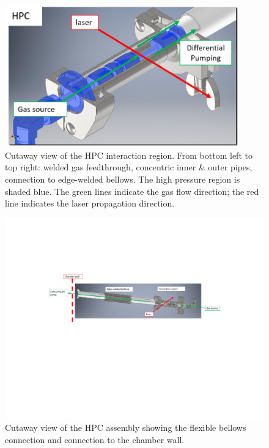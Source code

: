 \begin{figure}
	\centering
	\includegraphics[width=0.9\textwidth]{figures/chap3/HPC_cutaway2.png}
	\caption{Cutaway view of the HPC interaction region. From bottom left to top right: welded gas feedthrough, concentric inner \& outer pipes, connection to edge-welded bellows. The high pressure region is shaded blue. The green lines indicate the gas flow direction; the red line indicates the laser propagation direction.}
	\label{fig:HPC_cutaway2}
\end{figure}

\begin{figure}
	\centering
	\includegraphics[width=1.0\textwidth]{figures/chap3/HPC_cutaway_bellows.pdf}
	\caption{Cutaway view of the HPC assembly showing the flexible bellows connection and connection to the chamber wall.}
	\label{fig:HPC_cutaway_bellows}
\end{figure}

